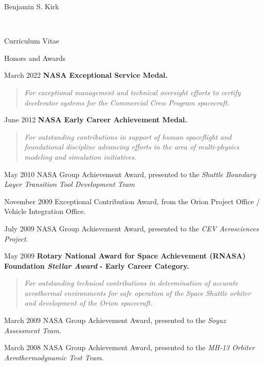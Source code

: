 \documentclass[10pt]{report}
\begin{document}
\begin{cv}{\centerline{\Large Benjamin S. Kirk}\\
    \centerline{\large Curriculum Vitae}}
  \begin{cvlist}{Honors and Awards}

    \item[March 2022]
      \textbf{NASA Exceptional Service Medal.}

      \begin{quote}
        \em For exceptional management and technical oversight efforts to certify decelerator systems for the Commercial Crew Program spacecraft.
      \end{quote}

    \item[June 2012]
      \textbf{NASA Early Career Achievement Medal.}

      \begin{quote}
        \em For outstanding contributions in support of human spaceflight and foundational discipline advancing efforts in the area of multi-physics modeling and simulation initiatives.
      \end{quote}

    \item[May 2010]
      NASA Group Achievement Award, presented to the {\em Shuttle Boundary Layer Transition Tool Development Team}

    \item[November 2009]
      Exceptional Contribution Award, from the Orion Project Office / Vehicle Integration Office.

    \item[July 2009]
    NASA Group Achievement Award, presented to the {\em CEV Aerosciences Project}.

    \item[May 2009]
      \textbf{Rotary National Award for Space Achievement (RNASA) Foundation {\em Stellar Award} - Early Career Category.}
      \begin{quote}
        \em For outstanding technical contributions in determination of accurate aerothermal environments for safe operation of the Space Shuttle orbiter and development of the Orion spacecraft.
      \end{quote}


    \item[March 2009]
    NASA Group Achievement Award, presented to the {\em Soyuz Assessment Team}.

    \item[March 2008]
    NASA Group Achievement Award, presented to the {\em MH-13 Orbiter Aerothermodynamic Test Team}.


\end{cvlist}
\end{cv}
\end{document}
